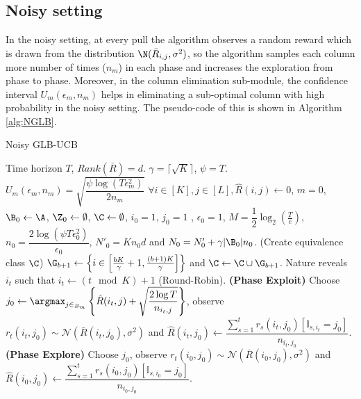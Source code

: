 \subsection{Noisy setting}
\label{alg:noisy}

In the noisy setting, at every pull the algorithm observes a random reward which is drawn from the distribution $\N(\bar{R}_{i,j}, \sigma^2)$, so the algorithm samples each column more number of times ($n_m$) in each phase and increases the exploration from phase to phase. Moreover, in the column elimination sub-module, the confidence interval $U_m(\epsilon_m, n_m)$  helps in eliminating a sub-optimal column with high probability in the noisy setting. The pseudo-code of this is shown in Algorithm \ref{alg:NGLB}.


\begin{algorithm}[!th]
\caption{Noisy GLB-UCB}
\label{alg:NGLB}
\begin{algorithmic}[1]
 Time horizon $T$, $Rank(\bar{R}) = d$.
 $\gamma = \lceil\sqrt{K} \rceil$, $\psi = T$.
 $U_m(\epsilon_m, n_m) = \sqrt{\dfrac{\psi\log(T\epsilon_m^2)}{2n_m} }$
 $\forall i\in [K], j\in [L], \hat{R}(i,j) \leftarrow 0$, $m=0$, $\B_0 \leftarrow \A$, $\Z_0 \leftarrow \emptyset$, $\C \leftarrow \emptyset$,  $i_0=1$, $j_0=1$ , $\epsilon_0 = 1$, $M=\dfrac{1}{2}\log_2\left( \frac{T}{e}\right)$, $n_0 = \dfrac{2\log(\psi T\epsilon_{0}^2)}{\epsilon_{0}} $, $N'_0 = K n_0 d$ and $N_0 = N'_0 + \gamma |\B_0|n_0$.
 (Create equivalence class $\C$)
\State  $\G_{b+1}\leftarrow \left\lbrace i\in \left[\frac{bK}{\gamma}+1,\frac{(b+1)K}{\gamma}\right]\right\rbrace$ and $\C\leftarrow \C\cup \G_{b+1}$.
\EndFor
{}	
\State Nature reveals $i_t$ such that $i_t \leftarrow (t \mod K) + 1$ (Round-Robin).
 \textbf{ (Phase Exploit) }
\State Choose $j_0\leftarrow \argmax_{j\in_{B_m}}\left\lbrace \hat{R}(i_t,j)  + \sqrt{\dfrac{2\log T}{n_{i_t,j}}}\right\rbrace $, observe $r_t(i_t,j_0)\sim \mathcal{N}(\bar{R}(i_t,j_0),\sigma^2)$ and $\hat{R}(i_t,j_0)\leftarrow \dfrac{\sum_{s=1}^{t}r_s(i_t,j_0)[\mathbb{I}_{s,i_t} = j_0]}{n_{i_t,j_0}}$.
 \textbf{ (Phase Explore) }
\State Choose $j_0$, observe $r_t(i_0,j_0)\sim\mathcal{N}(\bar{R}(i_0,j_0),\sigma^2) $ and $\hat{R}(i_0,j_0)\leftarrow \dfrac{\sum_{s=1}^{t}r_s(i_0,j_0)[\mathbb{I}_{s,i_0} = j_0]}{n_{i_0,j_0}}$.

\end{algorithmic}
\end{algorithm}
